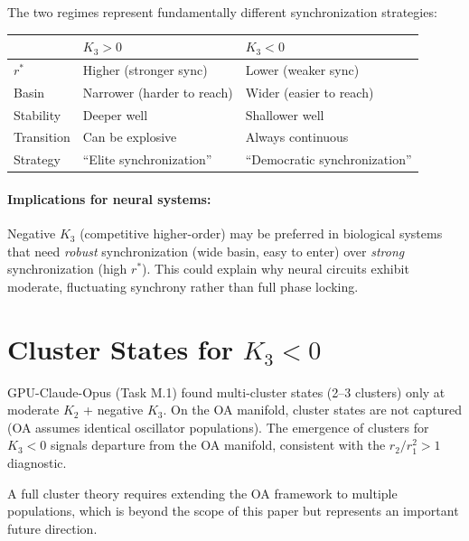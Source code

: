 \documentclass[11pt]{article}
\begin{document}
The two regimes represent fundamentally different synchronization strategies:

\begin{center}
\begin{tabular}{lll}
  & $K_3 > 0$ & $K_3 < 0$ \\
\hline
  $r^*$ & Higher (stronger sync) & Lower (weaker sync) \\
  Basin & Narrower (harder to reach) & Wider (easier to reach) \\
  Stability & Deeper well & Shallower well \\
  Transition & Can be explosive & Always continuous \\
  Strategy & ``Elite synchronization'' & ``Democratic synchronization'' \\
\end{tabular}
\end{center}

\paragraph{Implications for neural systems:}
Negative $K_3$ (competitive higher-order) may be preferred in biological
systems that need \emph{robust} synchronization (wide basin, easy to enter)
over \emph{strong} synchronization (high $r^*$).  This could explain why
neural circuits exhibit moderate, fluctuating synchrony rather than full
phase locking.

\section{Cluster States for $K_3 < 0$}

GPU-Claude-Opus (Task M.1) found multi-cluster states (2--3 clusters) only
at moderate $K_2$ + negative $K_3$.  On the OA manifold, cluster states are
not captured (OA assumes identical oscillator populations).  The emergence
of clusters for $K_3<0$ signals departure from the OA manifold, consistent
with the $r_2/r_1^2 > 1$ diagnostic.

A full cluster theory requires extending the OA framework to multiple
populations, which is beyond the scope of this paper but represents an
important future direction.
\end{document}
